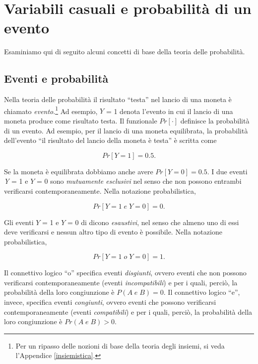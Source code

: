 \documentclass[
  11pt,
]{krantz}
\theoremstyle{definition}
\theoremstyle{definition}
\theoremstyle{definition}
\theoremstyle{definition}
\theoremstyle{remark}
\begin{document}
\hypertarget{variabili-casuali-e-probabilituxe0-di-un-evento}{%
\section{Variabili casuali e probabilità di un evento}\label{variabili-casuali-e-probabilituxe0-di-un-evento}}

Esaminiamo qui di seguito alcuni concetti di base della teoria delle probabilità.

\hypertarget{eventi-e-probabilituxe0}{%
\subsection{Eventi e probabilità}\label{eventi-e-probabilituxe0}}

Nella teoria delle probabilità il risultato ``testa'' nel lancio di una moneta è chiamato \emph{evento}.\footnote{Per un ripasso delle nozioni di base della teoria degli insiemi, si veda l'Appendice \ref{insiemistica}.} Ad esempio, \(Y\) = 1 denota l'evento in cui il lancio di una moneta produce come risultato testa. Il funzionale \(Pr[·]\) definisce la probabilità di un evento. Ad esempio, per il lancio di una moneta equilibrata, la probabilità dell'evento ``il risultato del lancio della moneta è testa'' è scritta come

\[
Pr[Y = 1] = 0.5.
\]

Se la moneta è equilibrata dobbiamo anche avere \(Pr[Y = 0] = 0.5\). I due eventi \emph{Y} = 1 e \(Y\) = 0 sono \emph{mutuamente esclusivi} nel senso che non possono entrambi verificarsi contemporaneamente. Nella notazione probabilistica,

\[
Pr[Y = 1\; e \; Y = 0] = 0.
\]

Gli eventi \(Y\) = 1 e \(Y\) = 0 di dicono \emph{esaustivi}, nel senso che almeno uno di essi deve verificarsi e nessun altro tipo di evento è possibile. Nella notazione probabilistica,

\[
Pr[Y = 1\; o \; Y = 0] = 1.
\]

Il connettivo logico ``o'' specifica eventi \emph{disgiunti}, ovvero eventi che non possono verificarsi contemporaneamente (eventi \emph{incompatibili}) e per i quali, perciò, la probabilità della loro congiunzione è \(P(A \; e \; B) = 0\). Il connettivo logico ``e'', invece, specifica eventi \emph{congiunti}, ovvero eventi che possono verificarsi contemporaneamente (eventi \emph{compatibili}) e per i quali, perciò, la probabilità della loro congiunzione è \(Pr(A \; e \; B) > 0\).
\end{document}
